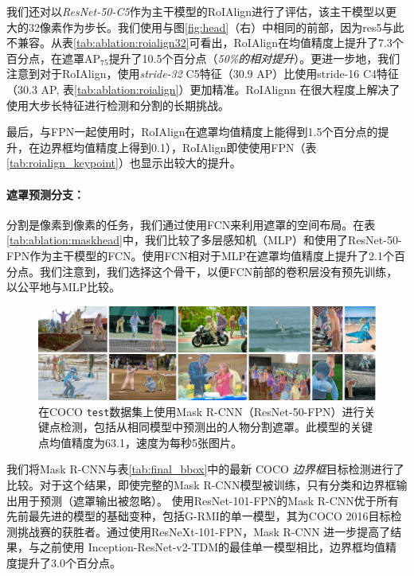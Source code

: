 我们还对以\emph{ResNet-50-C5}作为主干模型的RoIAlign进行了评估，该主干模型以更大的32像素作为步长。我们使用与图\ref{fig:head}（右）中相同的前部，因为res5与此不兼容。从表\ref{tab:ablation:roialign32}可看出，RoIAlign在均值精度上提升了7.3个百分点，在遮罩AP$_{75}$提升了10.5个百分点（\emph{50\%的相对提升}）。更进一步地，我们注意到对于RoIAlign，使用\emph{stride-32} C5特征（30.9 AP）比使用stride-16 C4特征（30.3 AP, 表\ref{tab:ablation:roialign}）更加精准。RoIAlignn 在很大程度上解决了使用大步长特征进行检测和分割的长期挑战。

最后，与FPN一起使用时，RoIAlign在遮罩均值精度上能得到1.5个百分点的提升，在边界框均值精度上得到0.1），RoIAlign即使使用FPN（表\ref{tab:roialign_keypoint}）也显示出较大的提升。

\paragraph{遮罩预测分支：} 分割是像素到像素的任务，我们通过使用FCN来利用遮罩的空间布局。在表\ref{tab:ablation:maskhead}中，我们比较了多层感知机（MLP）和使用了ResNet-50-FPN作为主干模型的FCN。使用FCN相对于MLP在遮罩均值精度上提升了2.1个百分点。我们注意到，我们选择这个骨干，以便FCN前部的卷积层没有预先训练，以公平地与MLP比较。

\begin{figure}[t]
\centering
\includegraphics[width=1.0\linewidth]{figures/mask_rcnn/results_keypoints}
\caption{在COCO \texttt{test}数据集上使用Mask R-CNN（ResNet-50-FPN）进行关键点检测，包括从相同模型中预测出的人物分割遮罩。此模型的关键点均值精度为63.1，速度为每秒5张图片。}
\label{fig:results_keypoints}
\end{figure}


我们将Mask R-CNN与表\ref{tab:final_bbox}中的最新 COCO \emph{边界框}目标检测进行了比较。对于这个结果，即使完整的Mask R-CNN模型被训练，只有分类和边界框输出用于预测（遮罩输出被忽略）。 使用ResNet-101-FPN的Mask R-CNN优于所有先前最先进的模型的基础变种，包括G-RMI的单一模型，其为COCO 2016目标检测挑战赛的获胜者。通过使用ResNeXt-101-FPN，Mask R-CNN 进一步提高了结果，与之前使用 Inception-ResNet-v2-TDM的最佳单一模型相比，边界框均值精度提升了3.0个百分点。

